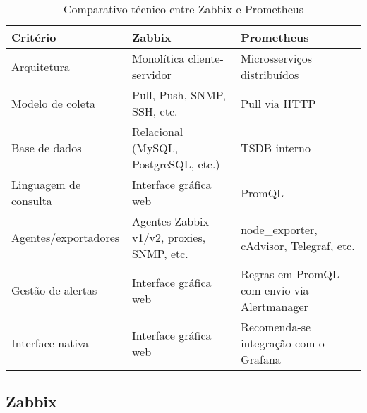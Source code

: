 \begin{table}[H]
\centering
\caption{Comparativo técnico entre Zabbix e Prometheus}
\label{tab:comparativo-zabbix-prometheus}
\begin{tabular}{@{}p{4cm} p{5.3cm} p{5.3cm}@{}}
\toprule
\textbf{Critério} & \textbf{Zabbix} & \textbf{Prometheus} \\
\midrule
Arquitetura & Monolítica cliente-servidor & Microsserviços distribuídos \\
Modelo de coleta & Pull, Push, SNMP, SSH, etc. & Pull via HTTP \\
Base de dados & Relacional (MySQL, PostgreSQL, etc.) & TSDB interno \\
Linguagem de consulta & Interface gráfica web & PromQL \\
Agentes/exportadores & Agentes Zabbix v1/v2, proxies, SNMP, etc. & node\_exporter, cAdvisor, Telegraf, etc. \\
Gestão de alertas & Interface gráfica web & Regras em PromQL com envio via Alertmanager \\
Interface nativa & Interface gráfica web & Recomenda-se integração com o Grafana \\
\bottomrule
\end{tabular}
\end{table}


\subsection{Zabbix}
\label{subsection:Zabbix}

